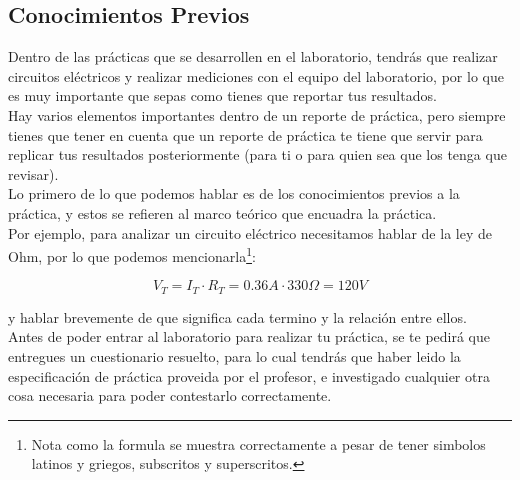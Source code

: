 
\subsection{Conocimientos Previos}



		Dentro de las prácticas que se desarrollen en el laboratorio, tendrás que realizar circuitos eléctricos y realizar mediciones con el equipo del laboratorio, por lo que es muy importante que sepas como tienes que reportar tus resultados. \\

		Hay varios elementos importantes dentro de un reporte de práctica, pero siempre tienes que tener en cuenta que un reporte de práctica te tiene que servir para replicar tus resultados posteriormente (para ti o para quien sea que los tenga que revisar). \\

		Lo primero de lo que podemos hablar es de los conocimientos previos a la práctica, y estos se refieren al marco teórico que encuadra la práctica. \\

		Por ejemplo, para analizar un circuito eléctrico necesitamos hablar de la ley de Ohm, por lo que podemos mencionarla\footnote{Nota como la formula se muestra correctamente a pesar de tener simbolos latinos y griegos, subscritos y superscritos.}:

		\begin{equation}
			V_T = I_T \cdot R_T = 0.36 A \cdot 330 \Omega = 120 V
		\end{equation}

		y hablar brevemente de que significa cada termino y la relación entre ellos. \\

		Antes de poder entrar al laboratorio para realizar tu práctica, se te pedirá que entregues un cuestionario resuelto, para lo cual tendrás que haber leido la especificación de práctica proveida por el profesor, e investigado cualquier otra cosa necesaria para poder contestarlo correctamente. \\

